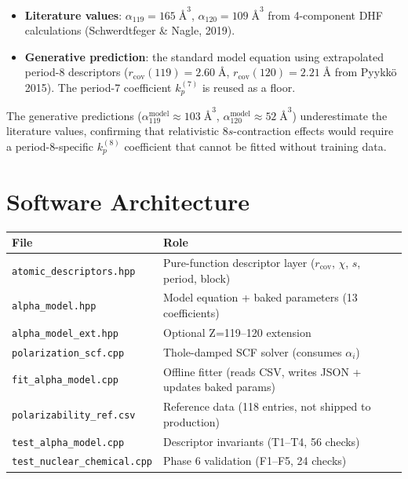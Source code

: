 \documentclass[11pt,letterpaper]{article}
\newcommand{\rcov}{r_{\mathrm{cov}}}
\newcommand{\kp}{k_p}
\newcommand{\Ang}{\text{\AA}}
\begin{document}
\begin{itemize}
\item \textbf{Literature values}: $\alpha_{119} = 165\;\Ang^3$,
  $\alpha_{120} = 109\;\Ang^3$ from 4-component DHF calculations
  (Schwerdtfeger \& Nagle, 2019).
\item \textbf{Generative prediction}: the standard model equation using
  extrapolated period-8 descriptors ($\rcov(119) = 2.60\;\Ang$,
  $\rcov(120) = 2.21\;\Ang$ from Pyykk\"o 2015).  The period-7
  coefficient $\kp^{(7)}$ is reused as a floor.
\end{itemize}

\noindent The generative predictions ($\alpha_{119}^{\mathrm{model}}
\approx 103\;\Ang^3$, $\alpha_{120}^{\mathrm{model}} \approx 52\;\Ang^3$)
underestimate the literature values, confirming that relativistic
$8s$-contraction effects would require a period-8-specific $\kp^{(8)}$
coefficient that cannot be fitted without training data.

\section{Software Architecture}
\label{sec:arch}

\begin{center}
\begin{tabular}{ll}
\toprule
\textbf{File} & \textbf{Role} \\
\midrule
\texttt{atomic\_descriptors.hpp}     & Pure-function descriptor layer ($\rcov$, $\chi$, $s$, period, block) \\
\texttt{alpha\_model.hpp}            & Model equation + baked parameters (13 coefficients) \\
\texttt{alpha\_model\_ext.hpp}       & Optional Z=119--120 extension \\
\texttt{polarization\_scf.cpp}       & Thole-damped SCF solver (consumes $\alpha_i$) \\
\texttt{fit\_alpha\_model.cpp}       & Offline fitter (reads CSV, writes JSON + updates baked params) \\
\texttt{polarizability\_ref.csv}     & Reference data (118 entries, not shipped to production) \\
\texttt{test\_alpha\_model.cpp}      & Descriptor invariants (T1--T4, 56 checks) \\
\texttt{test\_nuclear\_chemical.cpp} & Phase 6 validation (F1--F5, 24 checks) \\
\bottomrule
\end{tabular}
\end{center}
\end{document}
